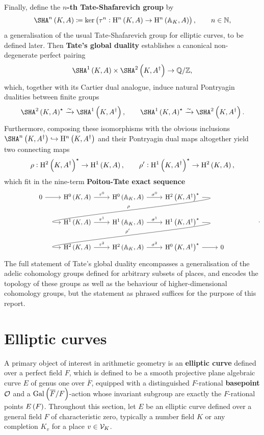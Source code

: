 \noindent
Finally, define the \textbf{$ n $-th Tate-Shafarevich group} by
$$ \SHA^n\br{K, A} \coloneqq \ker \br{\tau^n : \H^n\br{K, A} \to \H^n\br{\AA_K, A}}, \qquad n \in \NN, $$
a generalisation of the usual Tate-Shafarevich group for elliptic curves, to be defined later. Then \textbf{Tate's global duality} establishes a canonical non-degenerate perfect pairing
$$ \Sha[K, A] \times \SHA^2\br{K, A^\dagger} \to \QQ / \ZZ, $$
which, together with its Cartier dual analogue, induce natural Pontryagin dualities between finite groups
$$ \SHA^2\br{K, A}^\star \xrightarrow{\sim} \Sha[K, A^\dagger], \qquad \Sha[K, A]^\star \xrightarrow{\sim} \SHA^2\br{K, A^\dagger}. $$
Furthermore, composing these isomorphisms with the obvious inclusions $ \SHA^n\br{K, A^\dagger} \hookrightarrow \H^n\br{K, A^\dagger} $ and their Pontryagin dual maps altogether yield two connecting maps
$$ \rho : \H^2\br{K, A^\dagger}^\star \to \H^1\br{K, A}, \qquad \rho' : \H^1\br{K, A^\dagger}^\star \to \H^2\br{K, A}, $$
which fit in the nine-term \textbf{Poitou-Tate exact sequence} \cite[Theorem I.4.10]{Mil06}
$$
\begin{tikzcd}
0 \arrow{r} & \H^0\br{K, A} \arrow{r}{\tau^0} & \H^0\br{\AA_K, A} \arrow{r}{\sigma^0} & \H^2\br{K, A^\dagger}^\star \arrow[in=180, out=0]{dll}[swap]{\rho} & \\
& \H^1\br{K, A} \arrow{r}{\tau^1} & \H^1\br{\AA_K, A} \arrow{r}{\sigma^1} & \H^1\br{K, A^\dagger}^\star \arrow[in=180, out=0]{dll}[swap]{\rho'} & \\
& \H^2\br{K, A} \arrow{r}{\tau^2} & \H^2\br{\AA_K, A} \arrow{r}{\sigma^2} & \H^0\br{K, A^\dagger}^\star \arrow{r} & 0
\end{tikzcd}.
$$
The full statement of Tate's global duality encompasses a generalisation of the adelic cohomology groups defined for arbitrary subsets of places, and encodes the topology of these groups as well as the behaviour of higher-dimensional cohomology groups, but the statement as phrased suffices for the purpose of this report.

\pagebreak

\section{Elliptic curves}

A primary object of interest in arithmetic geometry is an \textbf{elliptic curve} defined over a perfect field $ F $, which is defined to be a smooth projective plane algebraic curve $ E $ of genus one over $ \overline{F} $, equipped with a distinguished $ F $-rational \textbf{basepoint} $ \mathcal{O} $ and a $ \AG{F} $-action whose invariant subgroup are exactly the $ F $-rational points $ E\br{F} $. Throughout this section, let $ E $ be an elliptic curve defined over a general field $ F $ of characteristic zero, typically a number field $ K $ or any completion $ K_v $ for a place $ v \in \mathcal{V}_K $.

